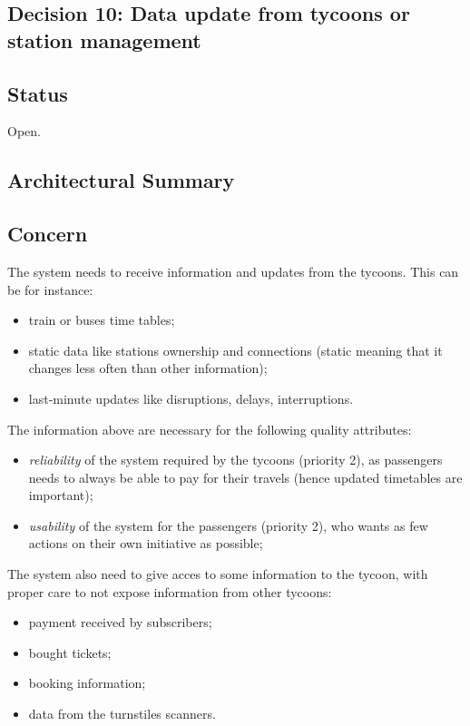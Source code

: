 \subsection{Decision 10: Data update from tycoons or station management}

\subsection*{Status}
Open.
\subsection*{Architectural Summary}


\subsection*{Concern}
The system needs to receive information and updates from the tycoons. 
This can be for instance:
\begin{itemize}
    \item train or buses time tables;
    \item static data like stations ownership and connections (static meaning that it changes less often than other information);
    \item last-minute updates like disruptions, delays, interruptions.
\end{itemize}
The information above are necessary for the following quality attributes:
\begin{itemize}
    \item \textit{reliability} of the system required by the tycoons (priority 2), as passengers needs to always be able to pay for their travels (hence updated timetables are important);
    \item \textit{usability} of the system for the passengers (priority 2), who wants as few actions on their own initiative as possible;
\end{itemize}

The system also need to give acces to some information to the tycoon, with proper care to not expose information from other tycoons:
\begin{itemize}
    \item payment received by subscribers;
    \item bought tickets;
    \item booking information;
    \item data from the turnstiles scanners. 
\end{itemize}

